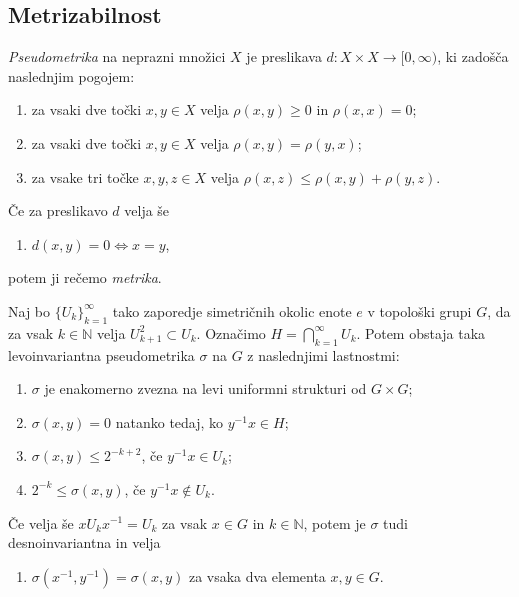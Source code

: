 \documentclass[mat1]{fmfdelo}
\newcommand{\N}{\mathbb N}
\begin{document}
\subsection{Metrizabilnost}

\begin{definicija}\label{def:metrika}
	\emph{Pseudometrika} na neprazni množici $X$ je preslikava $d: X \times X \to  [0, \infty)$, ki zadošča naslednjim pogojem:
	\begin{enumerate}
		\item za vsaki dve točki $x, y \in X$ velja $\rho (x, y) \geq 0$ in $\rho (x, x) = 0$;
		\item za vsaki dve točki $x, y \in X$ velja $\rho (x, y) = \rho (y, x)$;
		\item za vsake tri točke $x, y, z \in X$ velja $\rho (x, z) \leq \rho (x, y) + \rho (y, z)$.
	\end{enumerate}
	Če za preslikavo $d$ velja še
	\begin{enumerate}[resume]
		\item $d(x,y) = 0 \iff x = y$,
	\end{enumerate}
	potem ji rečemo \emph{metrika}.
\end{definicija}

\begin{izrek}\label{izr:pseudometrika}
	Naj bo $\lbrace U_k \rbrace_{k = 1}^{\infty}$ tako zaporedje simetričnih okolic enote $e$ v topološki grupi $G$, da za vsak $k \in \N$ velja $U_{k+1}^2 \subset U_k$. Označimo $H = \bigcap_{k=1}^{\infty} U_k$. Potem obstaja taka levoinvariantna pseudometrika $\sigma$ na $G$ z naslednjimi lastnostmi:
	\begin{enumerate}
		\item $\sigma$ je enakomerno zvezna na levi uniformni strukturi od $G \times G$;
		\item $\sigma (x, y) = 0$ natanko tedaj, ko $y^{-1}x \in H$;
		\item $\sigma (x, y) \leq 2^{-k+2}$, če $y^{-1}x \in U_k$;
		\item $2^{-k} \leq \sigma (x, y)$, če $y^{-1}x \notin U_k$.
	\end{enumerate}
	
	Če velja še $x U_k x^{-1} = U_k$ za vsak $x \in G$ in $k \in \N$, potem je $\sigma$ tudi desnoinvariantna in velja
	\begin{enumerate}[resume]
		\item $\sigma (x^{-1}, y^{-1}) = \sigma (x, y)$ za vsaka dva elementa $x, y \in G$.
	\end{enumerate}
\end{izrek}
\end{document}
